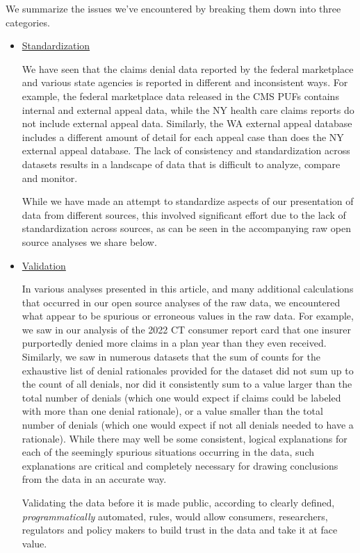 \documentclass[12pt, a4paper,twoside]{report}
\theoremstyle{plain} %
\theoremstyle{definition} %
\theoremstyle{remark} %
\numberwithin{equation}{chapter}
\begin{document}
		We summarize the issues we've encountered by breaking them down into three categories.
		
		\begin{itemize}
			\item \underline{Standardization}
			
			We have seen that the claims denial data reported by the federal marketplace and various state agencies is reported in different and inconsistent ways. For example, the federal marketplace data released in the CMS PUFs contains internal and external appeal data, while the NY health care claims reports do not include external appeal data. Similarly, the WA external appeal database includes a different amount of detail for each appeal case than does the NY external appeal database. The lack of consistency and standardization across datasets results in a landscape of data that is difficult to analyze, compare and monitor.
			
			While we have made an attempt to standardize aspects of our presentation of data from different sources, this involved significant effort due to the lack of standardization across sources, as can be seen in the accompanying raw open source analyses we share below.
			
			\item \underline{Validation}
			
			In various analyses presented in this article, and many additional calculations that occurred in our open source analyses of the raw data, we encountered what appear to be spurious or erroneous values in the raw data. For example, we saw in our analysis of the 2022 CT consumer report card that one insurer purportedly denied more claims in a plan year than they even received. Similarly, we saw in numerous datasets that the sum of counts for the exhaustive list of denial rationales provided for the dataset did not sum up to the count of all denials, nor did it consistently sum to a value larger than the total number of denials (which one would expect if claims could be labeled with more than one denial rationale), or a value smaller than the total number of denials (which one would expect if not all denials needed to have a rationale). While there may well be some consistent, logical explanations for each of the seemingly spurious situations occurring in the data, such explanations are critical and completely necessary for drawing conclusions from the data in an accurate way.
			
			Validating the data before it is made public, according to clearly defined, \emph{programmatically} automated, rules, would allow consumers, researchers, regulators and policy makers to build trust in the data and take it at face value.
			

\end{itemize}
\end{document}
